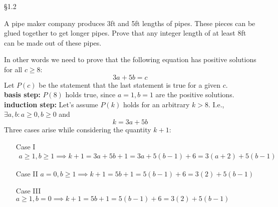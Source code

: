 \documentclass[boxes, qed]{homework}
\begin{document}
\newenvironment{amatrix}[1]{%
  \left[\begin{array}{@{}*{#1}{c}|c@{}}
}{%
  \end{array}\right]
}

\newenvironment{augmatrix}[1]{%
  \left[\begin{array}{#1}
}{%
  \end{array}\right]
}

\S1.2
\begin{problem}
    A pipe maker company produces 3ft and 5ft lengths of pipes. 
    These pieces can be glued together to get longer pipes. 
    Prove that any integer length of at least 8ft can be 
    made out of these pipes.
\end{problem}
\begin{solution}
    In other words we need to prove that the following equation
    has positive solutions for all $c \ge 8$:
    $$3a + 5b = c$$
    Let $P(c)$ be the statement that the last statement is true for
    a given $c$.\\

    \textbf{basis step:} $P(8)$ holds true, since $a=1, b=1$ 
    are the positive solutions.\\

    \textbf{induction step:} Let's assume $P(k)$ holds for an arbitrary
    $k>8$. I.e., $\exists a,b: a\ge{0},b\ge{0}$ and
    $$k=3a+5b$$
    Three cases arise while considering the quantity $k+1$:
    \begin{enumerate}
        \item[Case I] 
        \begin{align*}
            a\ge{1}, b\ge{1} 
                \implies k+1 = 3a + 5b + 1 
                = 3a + 5(b-1) + 6
                = 3(a+2) + 5(b-1)
        \end{align*}

        \item[Case II] $a=0, b\ge{1} 
        \implies k+1 = 5b + 1 
        = 5(b-1) + 6
        = 3(2) + 5(b-1)$

        \item[Case III] $a\ge{1}, b=0 
        \implies k+1 = 5b + 1 
        = 5(b-1) + 6
        = 3(2) + 5(b-1)$
    \end{enumerate}
    
\end{solution}
\end{document}
